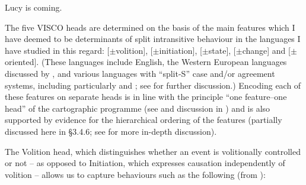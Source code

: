\documentclass[output=paper]{langsci/langscibook}
\begin{document}
\newpage
\ea
    Lucy is coming.\\
\z
The five VISCO heads are determined on the basis of the main features which I
have deemed to be determinants of split intransitive behaviour in the languages
I have studied in this regard: [$\pm$volition], [$\pm$initiation],
[$\pm$state], [$\pm$change] and [$\pm$oriented]. (These languages include
English, the Western European languages discussed by \citet{Sorace2000}, and
various languages with \enquote{split-S} case and/or agreement systems,
including particularly  and ; see
\citealt{Baker2016,Baker2018,Baker2019} for further discussion.) Encoding each
of these features on separate heads is in line with the principle \enquote{one
feature–one head} of the cartographic programme (see
\citealt{vanCraenenbroeck2009} and discussion in \citealt{Baker2018}) and is
also supported by evidence for the hierarchical ordering of the features
(partially discussed here in §3.4.6; see \citealt{Baker2018} for more in-depth
discussion).

The Volition head, which distinguishes whether an event is volitionally
controlled or not – as opposed to Initiation, which expresses causation
independently of volition – allows us to capture behaviours such as the
following (from ):
\end{document}
